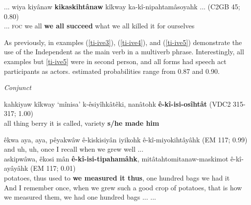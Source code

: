     \begin{exe}
    \ex
    \gll ... wiya kiyânaw \textbf{kikaskihtânaw} kîkway ka-kî-nipahtamâsoyahk ... \tiny{(C2GB 45; 0.80)} \\
        ... \textsc{foc} {we all} {\textbf{we all succeed}} what {we all killed it for ourselves} \\
    \trans  
    \label{ti-ive6}
    \end{exe}


 As previously, in examples (\ref{ti-ive3}), (\ref{ti-ive4}), and (\ref{ti-ive5}) demonstrate the use of the Independent as the main verb in a multiverb phrase. Interestingly, all examples but \ref{ti-ive5} were in second person, and all forms had speech act participants as actors. estimated probabilities range from 0.87 and 0.90.


\textit{Conjunct}

    \begin{exe}
    \ex 
    \gll kahkiyaw kîkway `mînisa' k-êsiyîhkâtêki, nanâtohk \textbf{ê-kî-isi-osîhtât} \tiny{(VDC2 315-317; 1.00)} \\
         all thing berry {it is called}, variety {\textbf{s/he made him}} \\
    \label{vti-ive6}
    \end{exe}

        \begin{exe}
    \ex 
    \gll êkwa aya, aya, pêyakwâw ê-kiskisiyân iyikohk ê-kî-miyokihtâyâhk \tiny{(EM 117; 0.99)}\\
         and uh, uh, once {I recall} when {we grew well} ... \\
         
    \gll askipwâwa, êkosi mân \textbf{ê-kî-isi-tipahamâhk}, mitâtahtomitanaw-maskimot ê-kî-ayâyâhk \tiny{(EM 117; 0.01)} \\
         potatoes, thus {used to} {\textbf{we measured it thus}}, {one hundred bags} {we had it}  \\
    \trans And I remember once, when we grew such a good crop of potatoes, that is how we measured them, we had one hundred bags ... \tiny{\citep[84-85]{Minde1997kwayask}} ...  \\
    \label{vti-ive7}
    \end{exe}

